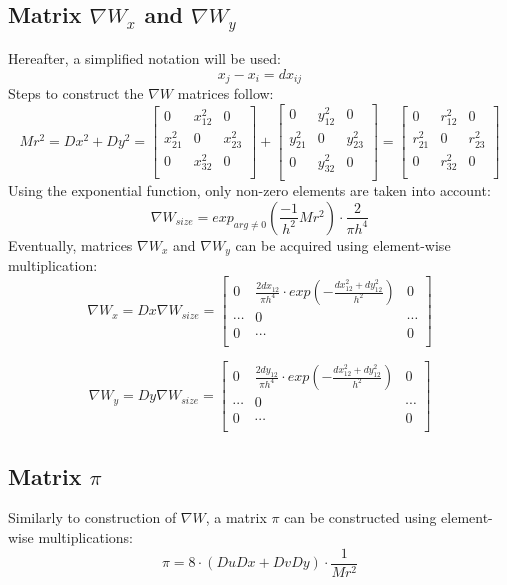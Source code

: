 \documentclass{article}
\begin{document}
\subsection{Matrix $\nabla W_x$ and $\nabla W_y$}
Hereafter, a simplified notation will be used:
$$ x_j-x_i=dx_{ij} $$
Steps to construct the $\nabla W$ matrices follow:
$$
Mr^2 = Dx^2 + Dy^2 = 
\begin{bmatrix}
0 & x_{12}^2 & 0\\
x_{21}^2 & 0 & x_{23}^2\\
0 & x_{32}^2 & 0\\
\end{bmatrix}
+
\begin{bmatrix}
0 & y_{12}^2 & 0\\
y_{21}^2 & 0 & y_{23}^2\\
0 & y_{32}^2 & 0\\
\end{bmatrix}
=
\begin{bmatrix}
0 & r_{12}^2 & 0\\
r_{21}^2 & 0 & r_{23}^2\\
0 & r_{32}^2 & 0\\
\end{bmatrix}
$$
Using the exponential function, only non-zero elements are taken into account:
$$
\nabla W_{size} = exp_{arg\neq0}\left(\frac{-1}{h^2}Mr^2\right)\cdot\frac{2}{\pi h^4}
$$
Eventually, matrices $\nabla W_x$ and $\nabla W_y$ can be acquired using element-wise multiplication:
$$
\nabla W_x = Dx\nabla W_{size} = 
\begin{bmatrix}
0 & \frac{2dx_{12}}{\pi h^4}\cdot exp\left(-\frac{dx_{12}^2+dy_{12}^2}{h^2}\right) & 0\\
\cdots & 0 & \cdots\\
0 & \cdots & 0\\
\end{bmatrix}
$$

$$
\nabla W_y = Dy\nabla W_{size} = 
\begin{bmatrix}
0 & \frac{2dy_{12}}{\pi h^4}\cdot exp\left(-\frac{dx_{12}^2+dy_{12}^2}{h^2}\right) & 0\\
\cdots & 0 & \cdots\\
0 & \cdots & 0\\
\end{bmatrix}
$$
\subsection{Matrix $\pi$}
Similarly to construction of $\nabla W$, a matrix $\pi$ can be constructed using element-wise multiplications:
$$\pi = 8\cdot\left(DuDx + DvDy\right)\cdot\frac{1}{Mr^2}$$
\end{document}
